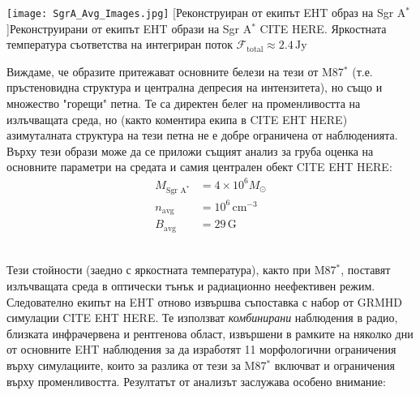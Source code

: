\begin{minipage}{15em}
	\centering
	\texttt{[image: SgrA\_Avg\_Images.jpg]}
	[Реконструиран от екипът EHT образ на Sgr A$^*$]{Реконструирани от екипът EHT образи на Sgr A$^*$ CITE HERE. Яркостната температура съответства на интегриран поток $\mathcal{F}_{\text{total}}\approx2.4\,\text{Jy}$}
	\label{SgrA_I_Image}
\end{minipage}
\begin{minipage}{16em}
Виждаме, че образите притежават основните белези на тези от M87$^*$ (т.е. пръстеновидна структура и централна депресия на интензитета), но също и множество "горещи" петна. Те са директен белег на променливостта на излъчващата среда, но (както коментира екипа в CITE EHT HERE) азимуталната структура на тези петна не е добре ограничена от наблюденията. Върху тези образи може да се приложи същият анализ за груба оценка на основните параметри на средата и самия централен обект CITE EHT HERE:
\begin{equation}
	\begin{aligned}
	M_{\text{Sgr A}^*} &= 4\times 10^6 M_\odot\\
	n_{\text{avg}} &= 10^6\, \text{cm}^{-3}\\
	B_{\text{avg}} &= 29\, \text{G}
	\end{aligned}
\end{equation}
\end{minipage}\\

Тези стойности (заедно с яркостната температура), както при M87$^*$, поставят излъчващата среда в оптически тънък и радиационно неефективен режим. Следователно екипът на EHT отново извършва съпоставка с набор от GRMHD симулации CITE EHT HERE. Те използват \emph{комбинирани} наблюдения в радио, близката инфрачервена и рентгенова област, извършени в рамките на няколко дни от основните EHT наблюдения за да изработят 11 морфологични ограничения върху симулациите, които за разлика от тези за M87$^*$ включват и ограничения върху променливостта. Резултатът от анализът заслужава особено внимание:\\

